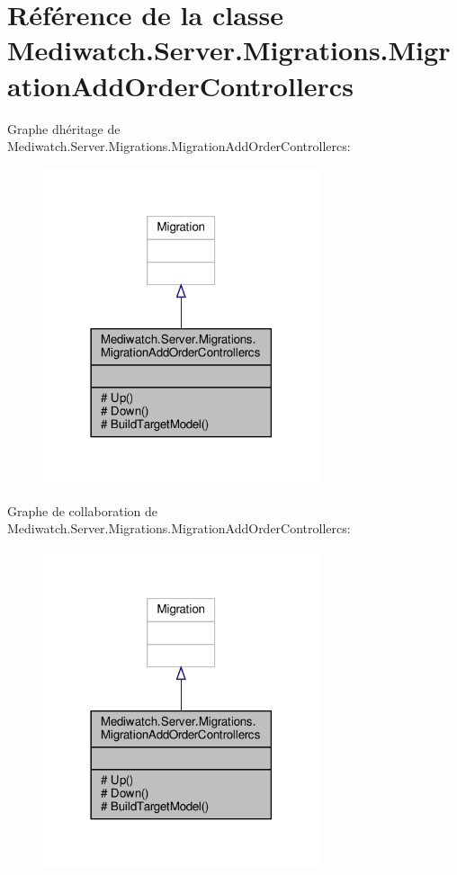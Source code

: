 \hypertarget{class_mediwatch_1_1_server_1_1_migrations_1_1_migration_add_order_controllercs}{}\section{Référence de la classe Mediwatch.\+Server.\+Migrations.\+Migration\+Add\+Order\+Controllercs}
\label{class_mediwatch_1_1_server_1_1_migrations_1_1_migration_add_order_controllercs}


Graphe d\textquotesingle{}héritage de Mediwatch.\+Server.\+Migrations.\+Migration\+Add\+Order\+Controllercs\+:
\nopagebreak
\begin{figure}[H]
\begin{center}
\leavevmode
\includegraphics[width=230pt]{class_mediwatch_1_1_server_1_1_migrations_1_1_migration_add_order_controllercs__inherit__graph}
\end{center}
\end{figure}


Graphe de collaboration de Mediwatch.\+Server.\+Migrations.\+Migration\+Add\+Order\+Controllercs\+:
\nopagebreak
\begin{figure}[H]
\begin{center}
\leavevmode
\includegraphics[width=230pt]{class_mediwatch_1_1_server_1_1_migrations_1_1_migration_add_order_controllercs__coll__graph}
\end{center}
\end{figure}
